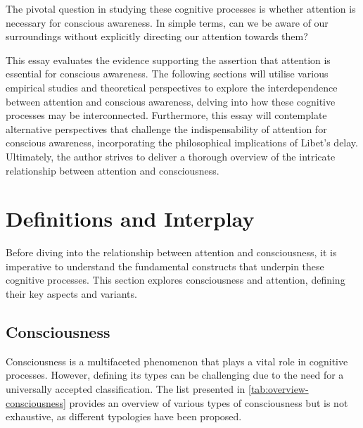 \documentclass[10pt]{article}
\begin{document}
\begin{sloppypar}
  The pivotal question in studying these cognitive processes is whether attention is necessary for conscious awareness. In simple terms, can we be aware of our surroundings without explicitly directing our attention towards them?

  This essay evaluates the evidence supporting the assertion that attention is essential for conscious awareness. The following sections will utilise various empirical studies and theoretical perspectives to explore the interdependence between attention and conscious awareness, delving into how these cognitive processes may be interconnected. Furthermore, this essay will contemplate alternative perspectives that challenge the indispensability of attention for conscious awareness, incorporating the philosophical implications of Libet’s delay. Ultimately, the author strives to deliver a thorough overview of the intricate relationship between attention and consciousness.

  \section{Definitions and Interplay}
  \label{sec:background}

  Before diving into the relationship between attention and consciousness, it is imperative to understand the fundamental constructs that underpin these cognitive processes. This section explores consciousness and attention, defining their key aspects and variants.

  \subsection{Consciousness}
  \label{sec:consciousness}

  Consciousness is a multifaceted phenomenon that plays a vital role in cognitive processes. However, defining its types can be challenging due to the need for a universally accepted classification. The list presented in \autoref{tab:overview-consciousness} provides an overview of various types of consciousness but is not exhaustive, as different typologies have been proposed.


\end{sloppypar}
\end{document}
